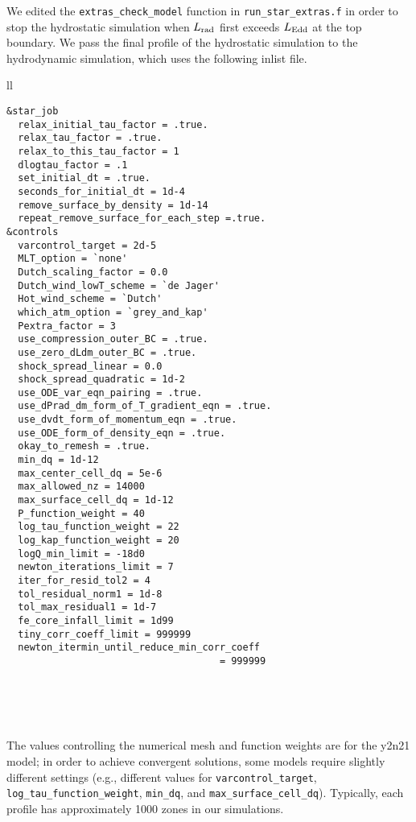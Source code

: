 \documentclass[apj,usenatbib, iop, twocolappendix]{emulateapj}
\newcommand{\Lrad}{L_{\rm rad}}
\newcommand{\Ledd}{L_{\rm Edd}}
\begin{document}
We edited the \texttt{extras\_check\_model} function in \texttt{run\_star\_extras.f} in order to stop the hydrostatic simulation when $\Lrad$ first exceeds $\Ledd$ at the top boundary.  We pass the final profile of the hydrostatic simulation to the hydrodynamic simulation, which uses the following inlist file.
\begin{tabular}{ll}
\toprule
\toprule
\begin{minipage}{3in}
\begin{verbatim}
&star_job
  relax_initial_tau_factor = .true.
  relax_tau_factor = .true.
  relax_to_this_tau_factor = 1
  dlogtau_factor = .1    
  set_initial_dt = .true.
  seconds_for_initial_dt = 1d-4    
  remove_surface_by_density = 1d-14
  repeat_remove_surface_for_each_step =.true.    
&controls  
  varcontrol_target = 2d-5    
  MLT_option = `none'
  Dutch_scaling_factor = 0.0
  Dutch_wind_lowT_scheme = `de Jager'
  Hot_wind_scheme = `Dutch'    
  which_atm_option = `grey_and_kap' 
  Pextra_factor = 3
  use_compression_outer_BC = .true.
  use_zero_dLdm_outer_BC = .true.    
  shock_spread_linear = 0.0
  shock_spread_quadratic = 1d-2    
  use_ODE_var_eqn_pairing = .true.
  use_dPrad_dm_form_of_T_gradient_eqn = .true.
  use_dvdt_form_of_momentum_eqn = .true.
  use_ODE_form_of_density_eqn = .true.    
  okay_to_remesh = .true.
  min_dq = 1d-12 
  max_center_cell_dq = 5e-6
  max_allowed_nz = 14000
  max_surface_cell_dq = 1d-12 
  P_function_weight = 40
  log_tau_function_weight = 22
  log_kap_function_weight = 20
  logQ_min_limit = -18d0   
  newton_iterations_limit = 7
  iter_for_resid_tol2 = 4
  tol_residual_norm1 = 1d-8
  tol_max_residual1 = 1d-7
  fe_core_infall_limit = 1d99
  tiny_corr_coeff_limit = 999999
  newton_itermin_until_reduce_min_corr_coeff 
                                     = 999999
\end{verbatim}
\end{minipage}
\\
\bottomrule
\end{tabular}
\\
\\
The values controlling the numerical mesh and function weights are for the y2n21 model; in order to achieve convergent solutions, some models require slightly different settings (e.g., different values for \texttt{varcontrol\_target}, \texttt{log\_tau\_function\_weight}, \texttt{min\_dq},  and \texttt{max\_surface\_cell\_dq}). Typically, each profile has approximately 1000 zones in our simulations. 



\end{document}
